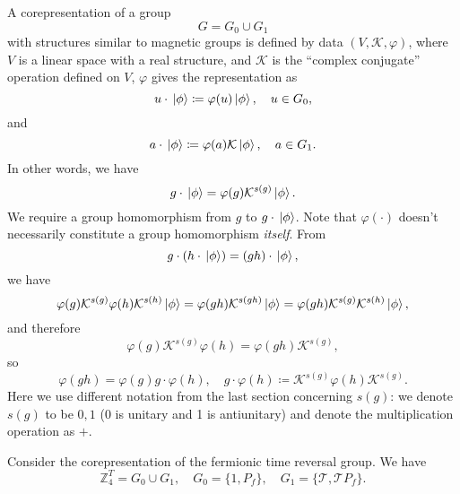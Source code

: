 \documentclass[hyperref, a4paper]{article}
\begin{document}
A corepresentation of a group 
\begin{equation}
    G = G_0 \cup G_1
\end{equation}
with structures similar to magnetic groups is defined by data $(V, \mathcal{K}, \varphi)$, where $V$ is a 
linear space with a real structure, and $\mathcal{K}$ is the ``complex conjugate'' operation defined on $V$,
$\varphi$ gives the representation as 
\begin{equation}
    u \cdot \ket*{\phi} \coloneqq \varphi(u) \ket*{\phi}, \quad u \in G_0,
\end{equation}
and 
\begin{equation}
    a \cdot \ket*{\phi} \coloneqq \varphi(a) \mathcal{K} \ket*{\phi}, \quad a \in G_1.
\end{equation}
In other words, we have 
\begin{equation}
    g \cdot \ket*{\phi} = \varphi(g) \mathcal{K}^{s(g)} \ket*{\phi}.
\end{equation}
We require a group homomorphism from $g$ to $g \cdot \ket*{\phi}$. Note that $\varphi(\cdot)$ doesn't necessarily 
constitute a group homomorphism \emph{itself}. From 
\[
    g \cdot (h \cdot \ket*{\phi}) = (gh) \cdot \ket*{\phi},
\]
we have 
\[
    \varphi(g) \mathcal{K}^{s(g)} \varphi(h) \mathcal{K}^{s(h)} \ket*{\phi} = \varphi(gh) \mathcal{K}^{s(gh)} \ket*{\phi} = \varphi(gh) \mathcal{K}^{s(g)} \mathcal{K}^{s(h)} \ket*{\phi},
\]
and therefore 
\[
    \varphi(g) \mathcal{K}^{s(g)} \varphi(h) = \varphi(gh) \mathcal{K}^{s(g)},
\]
so 
\begin{equation}
    \varphi(gh) = \varphi(g) g \cdot \varphi(h), \quad g \cdot \varphi(h) \coloneqq \mathcal{K}^{s(g)} \varphi(h) \mathcal{K}^{s(g)}.
\end{equation}
Here we use different notation from the last section concerning $s(g)$: we denote $s(g)$ to be $0, 1$ 
(0 is unitary and 1 is antiunitary) and denote the multiplication operation as $+$.

Consider the corepresentation of the fermionic time reversal group. 
We have 
\begin{equation}
    \mathbb{Z}_4^T = G_0 \cup G_1, \quad G_0 = \{ 1, P_f \}, \quad G_1 = \{ \mathcal{T}, \mathcal{T} P_f \}.
\end{equation}
\end{document}
